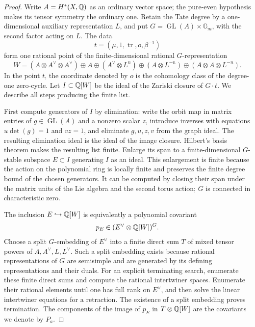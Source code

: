\begin{proof}
Write $A=H^*(X,\mathbb Q)$ as an ordinary vector space; the pure-even
hypothesis makes its tensor symmetry the ordinary one.  Retain the
Tate degree by a one-dimensional auxiliary representation $L$, and
put $G=\operatorname{GL}(A)\times\mathbb G_m$, with the second factor
acting on $L$.  The data
\[
 t=(\mu,1,\operatorname{tr},o,\beta^{-1})
\]
form one rational point of the finite-dimensional rational
$G$-representation
\[
 W=(A\otimes A^\vee\otimes A^\vee)\oplus A
   \oplus(A^\vee\otimes L^n)
   \oplus(A\otimes L^{-n})
   \oplus(A\otimes A\otimes L^{-n}).
\]
In the point $t$, the coordinate denoted by $o$ is the cohomology class
of the degree-one zero-cycle.  Let $I\subset\mathbb Q[W]$ be the ideal of
the Zariski closure of $G\cdot t$.  We describe all steps producing
the finite list.

First compute generators of $I$ by elimination: write the orbit map
in matrix entries of $g\in\operatorname{GL}(A)$ and a nonzero scalar
$z$, introduce inverses with equations $u\det(g)=1$ and $vz=1$, and
eliminate $g,u,z,v$ from the graph ideal.  The resulting elimination
ideal is the ideal of the image closure.  Hilbert's basis theorem
makes the resulting list finite.  Enlarge its span to a finite-dimensional
$G$-stable subspace $E\subset I$ generating $I$ as an ideal.
This enlargement is finite because the action on the polynomial ring
is locally finite and preserves the finite degree bound of the chosen
generators.  It can be computed by closing their span under the matrix
units of the Lie algebra and the second torus action; $G$ is connected
in characteristic zero.

The inclusion $E\hookrightarrow\mathbb Q[W]$ is equivalently a polynomial
covariant
\[
 p_E\in(E^\vee\otimes\mathbb Q[W])^G.
\]
Choose a split $G$-embedding of $E^\vee$ into a finite direct sum $T$
of mixed tensor powers of $A,A^\vee,L,L^\vee$.  Such a split embedding
exists because rational representations of $G$ are semisimple and
are generated by its defining representations and their duals.
For an explicit terminating search, enumerate these finite direct
sums and compute the rational intertwiner spaces.  Enumerate their
rational elements until one has full rank on $E^\vee$, and then
solve the linear intertwiner equations for a retraction.  The
existence of a split embedding proves termination.  The components of the image of
$p_E$ in $T\otimes\mathbb Q[W]$ are the covariants we denote by $P_a$.


\end{proof}
